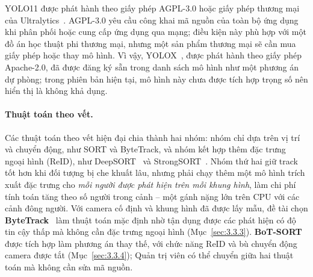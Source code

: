 YOLO11 được phát hành theo giấy phép AGPL-3.0 hoặc giấy phép thương mại của Ultralytics~\cite{ultralytics2024yolo11docs}. AGPL-3.0 yêu cầu công khai mã nguồn của toàn bộ ứng dụng khi phân phối hoặc cung cấp ứng dụng qua mạng; điều kiện này phù hợp với một đồ án học thuật phi thương mại, nhưng một sản phẩm thương mại sẽ cần mua giấy phép hoặc thay mô hình. Vì vậy, YOLOX~\cite{ge2021yolox}, được phát hành theo giấy phép Apache-2.0, đã được đăng ký sẵn trong danh sách mô hình như một phương án dự phòng; trong phiên bản hiện tại, mô hình này chưa được tích hợp trọng số nên hiển thị là không khả dụng.

\paragraph{Thuật toán theo vết.} Các thuật toán theo vết hiện đại chia thành hai nhóm: nhóm chỉ dựa trên vị trí và chuyển động, như SORT và ByteTrack, và nhóm kết hợp thêm đặc trưng ngoại hình (ReID), như DeepSORT~\cite{wojke2017deepsort} và StrongSORT~\cite{du2023strongsort}. Nhóm thứ hai giữ track tốt hơn khi đối tượng bị che khuất lâu, nhưng phải chạy thêm một mô hình trích xuất đặc trưng cho \emph{mỗi người được phát hiện trên mỗi khung hình}, làm chi phí tính toán tăng theo số người trong cảnh -- một gánh nặng lớn trên CPU với các cảnh đông người. Với camera cố định và khung hình đã được lấy mẫu, đề tài chọn \textbf{ByteTrack}~\cite{zhang2022bytetrack} làm thuật toán mặc định nhờ tận dụng được các phát hiện có độ tin cậy thấp mà không cần đặc trưng ngoại hình (Mục~\ref{sec:3.3.3}). \textbf{BoT-SORT}~\cite{aharon2022botsort} được tích hợp làm phương án thay thế, với chức năng ReID và bù chuyển động camera được tắt (Mục~\ref{sec:3.3.4}); Quản trị viên có thể chuyển giữa hai thuật toán mà không cần sửa mã nguồn.

